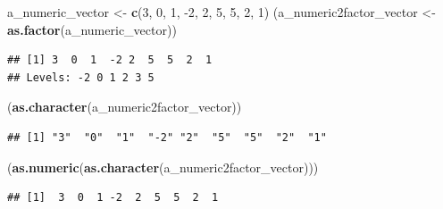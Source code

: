 \documentclass[
  ignorenonframetext,
]{beamer}
\newenvironment{Shaded}{\begin{snugshade}}{\end{snugshade}}
\newcommand{\DecValTok}[1]{\textcolor[rgb]{0.00,0.00,0.81}{#1}}
\newcommand{\KeywordTok}[1]{\textcolor[rgb]{0.13,0.29,0.53}{\textbf{#1}}}
\newcommand{\NormalTok}[1]{#1}
\newcommand{\StringTok}[1]{\textcolor[rgb]{0.31,0.60,0.02}{#1}}
\begin{document}
\begin{frame}[fragile]

\begin{Shaded}
\begin{Highlighting}[]
\NormalTok{a_numeric_vector <-}\StringTok{ }\KeywordTok{c}\NormalTok{(}\DecValTok{3}\NormalTok{, }\DecValTok{0}\NormalTok{, }\DecValTok{1}\NormalTok{, }\DecValTok{-2}\NormalTok{, }\DecValTok{2}\NormalTok{, }\DecValTok{5}\NormalTok{, }\DecValTok{5}\NormalTok{, }\DecValTok{2}\NormalTok{, }\DecValTok{1}\NormalTok{)}
\NormalTok{(a_numeric2factor_vector <-}\StringTok{ }\KeywordTok{as.factor}\NormalTok{(a_numeric_vector))}
\end{Highlighting}
\end{Shaded}

\begin{verbatim}
## [1] 3  0  1  -2 2  5  5  2  1 
## Levels: -2 0 1 2 3 5
\end{verbatim}

\begin{Shaded}
\begin{Highlighting}[]
\NormalTok{(}\KeywordTok{as.character}\NormalTok{(a_numeric2factor_vector))}
\end{Highlighting}
\end{Shaded}

\begin{verbatim}
## [1] "3"  "0"  "1"  "-2" "2"  "5"  "5"  "2"  "1"
\end{verbatim}

\begin{Shaded}
\begin{Highlighting}[]
\NormalTok{(}\KeywordTok{as.numeric}\NormalTok{(}\KeywordTok{as.character}\NormalTok{(a_numeric2factor_vector)))}
\end{Highlighting}
\end{Shaded}

\begin{verbatim}
## [1]  3  0  1 -2  2  5  5  2  1
\end{verbatim}

\end{frame}
\end{document}
